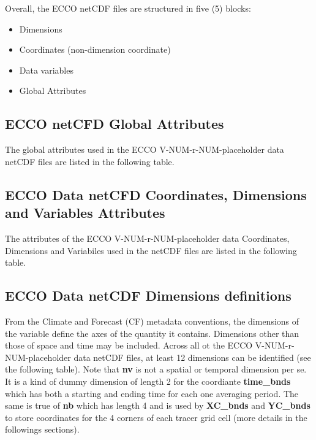 \par \vspace{0.1in} Overall, the ECCO netCDF  files are structured in five (5) blocks: 
\begin{itemize}
    \item Dimensions
    \item Coordinates (non-dimension coordinate)
    \item Data variables
    \item Global Attributes
\end{itemize}

\newpage

\subsection{ECCO netCFD Global Attributes}
\par The global attributes used in the ECCO V-NUM-r-NUM-placeholder data netCDF files are listed in the following table.
 

\newpage

\subsection{ECCO Data netCFD Coordinates, Dimensions and Variables Attributes}
\par The attributes of the ECCO V-NUM-r-NUM-placeholder data Coordinates, Dimensions and Variabiles used in the netCDF files are listed in the following table.
 

\newpage

\subsection{ECCO Data netCDF Dimensions definitions}
From the Climate and Forecast (CF) metadata conventions, the dimensions of the variable define the axes of the quantity it contains. Dimensions other than those of space and time may be included. Across all ot the ECCO V-NUM-r-NUM-placeholder data netCDF files, at least 12 dimensions can be identified (see the following table). Note that \textbf{nv} is not a spatial or temporal dimension per se. It is a kind of dummy dimension of length 2 for the coordiante \textbf{time\_bnds} which has both a starting and ending time for each one averaging period. The same is true of \textbf{nb} which has length 4 and is used by \textbf{XC\_bnds} and \textbf{YC\_bnds} to store coordinates for the 4 corners of each tracer grid cell (more details in the followings sections).


